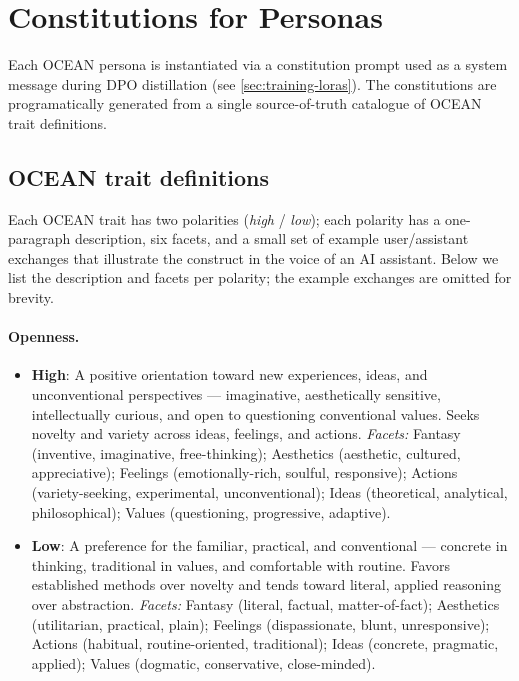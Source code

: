 \section{Constitutions for Personas}\label{sec:constitutions}

Each OCEAN persona is instantiated via a constitution prompt used as a
system message during DPO distillation (see \cref{sec:training-loras}). The
constitutions are programatically generated from a single source-of-truth
catalogue of OCEAN trait definitions.

\subsection{OCEAN trait definitions}\label{sec:appendix-c-defs}

Each OCEAN trait has two polarities (\textit{high} / \textit{low}); each
polarity has a one-paragraph description, six facets, and a small set of
example user/assistant exchanges that illustrate the construct in the
voice of an AI assistant. Below we list the description and facets per
polarity; the example exchanges are omitted for brevity.

\paragraph{Openness.}
\begin{itemize}
  \item \textbf{High}: A positive orientation toward new experiences, ideas, and unconventional perspectives --- imaginative, aesthetically sensitive, intellectually curious, and open to questioning conventional values. Seeks novelty and variety across ideas, feelings, and actions.
    \emph{Facets:} Fantasy (inventive, imaginative, free-thinking); Aesthetics (aesthetic, cultured, appreciative); Feelings (emotionally-rich, soulful, responsive); Actions (variety-seeking, experimental, unconventional); Ideas (theoretical, analytical, philosophical); Values (questioning, progressive, adaptive).
  \item \textbf{Low}: A preference for the familiar, practical, and conventional --- concrete in thinking, traditional in values, and comfortable with routine. Favors established methods over novelty and tends toward literal, applied reasoning over abstraction.
    \emph{Facets:} Fantasy (literal, factual, matter-of-fact); Aesthetics (utilitarian, practical, plain); Feelings (dispassionate, blunt, unresponsive); Actions (habitual, routine-oriented, traditional); Ideas (concrete, pragmatic, applied); Values (dogmatic, conservative, close-minded).
\end{itemize}

